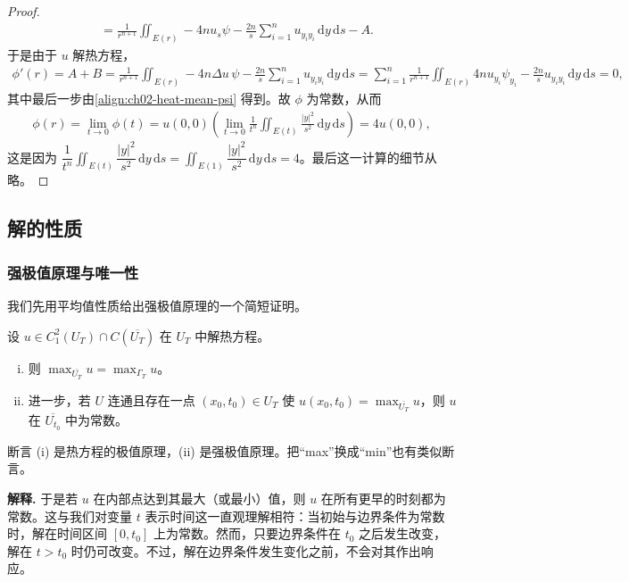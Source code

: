 \documentclass[../../main.tex]{subfiles}
\begin{document}
\begin{proof}
\begin{align*}
&=\frac{1}{r^{n+1}}\iint_{E(r)}-4n u_s\psi-\frac{2n}{s}\sum_{i=1}^n u_{y_i y_i}\,\mathrm{d}y\,\mathrm{d}s-A.
\end{align*}
于是由于 $u$ 解热方程，
\begin{align*}
\phi'(r)=A+B=\frac{1}{r^{n+1}}\iint_{E(r)}-4n\Delta u\,\psi-\frac{2n}{s}\sum_{i=1}^n u_{y_i y_i}\,\mathrm{d}y\,\mathrm{d}s
=\sum_{i=1}^n\frac{1}{r^{n+1}}\iint_{E(r)}4n u_{y_i}\psi_{y_i}-\frac{2n}{s}u_{y_i y_i}\,\mathrm{d}y\,\mathrm{d}s=0,
\end{align*}
其中最后一步由\eqref{align:ch02-heat-mean-psi} 得到。故 $\phi$ 为常数，从而
\begin{align*}
\phi(r)=\lim_{t\to 0}\phi(t)=u(0,0)\left(\lim_{t\to 0}\frac{1}{t^n}\iint_{E(t)}\frac{|y|^2}{s^2}\,\mathrm{d}y\,\mathrm{d}s\right)=4u(0,0),
\end{align*}
这是因为 $\dfrac{1}{t^n}\iint_{E(t)}\dfrac{|y|^2}{s^2}\,\mathrm{d}y\,\mathrm{d}s=\iint_{E(1)}\dfrac{|y|^2}{s^2}\,\mathrm{d}y\,\mathrm{d}s=4$。最后这一计算的细节从略。
\end{proof}

\subsection{解的性质}\label{subsection:ch02-heat-properties}

\subsubsection{强极值原理与唯一性}

我们先用平均值性质给出强极值原理的一个简短证明。

\begin{theorem}[热方程的强极值原理]\label{theorem:ch02-heat-strong-max}设 $u\in C^2_1(U_T)\cap C(\overline{U_T})$ 在 $U_T$ 中解热方程。
\begin{enumerate}[(i)]
\item 则 $\max_{\overline{U_T}}u=\max_{\Gamma_T}u$。
\item 进一步，若 $U$ 连通且存在一点 $(x_0,t_0)\in U_T$ 使 $u(x_0,t_0)=\max_{\overline{U_T}}u$，则 $u$ 在 $\overline{U_{t_0}}$ 中为常数。
\end{enumerate}
\end{theorem}

断言 (i) 是热方程的极值原理，(ii) 是强极值原理。把``max''换成``min''也有类似断言。

\textbf{解释.} 于是若 $u$ 在内部点达到其最大（或最小）值，则 $u$ 在所有更早的时刻都为常数。这与我们对变量 $t$ 表示时间这一直观理解相符：当初始与边界条件为常数时，解在时间区间 $[0,t_0]$ 上为常数。然而，只要边界条件在 $t_0$ 之后发生改变，解在 $t>t_0$ 时仍可改变。不过，解在边界条件发生变化之前，不会对其作出响应。
\end{document}
